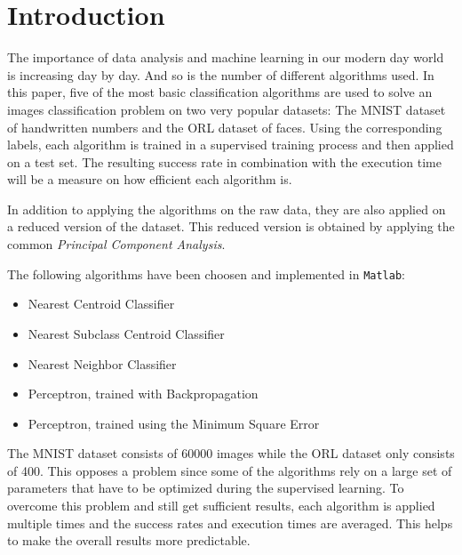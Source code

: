 \section{Introduction}
The importance of data analysis and machine learning in our modern day world is increasing day by day.
And so is the number of different algorithms used.
In this paper, five of the most basic classification algorithms are used to solve an images classification problem on two very popular datasets: The MNIST dataset of handwritten numbers and the ORL dataset of faces.
Using the corresponding labels, each algorithm is trained in a supervised training process and then applied on a test set.
The resulting success rate in combination with the execution time will be a measure on how efficient each algorithm is.

In addition to applying the algorithms on the raw data, they are also applied on a reduced version of the dataset.
This reduced version is obtained by applying the common \textit{Principal Component Analysis}.

The following algorithms have been choosen and implemented in \texttt{Matlab}:
\begin{itemize}
	\item Nearest Centroid Classifier
	\item Nearest Subclass Centroid Classifier
	\item Nearest Neighbor Classifier
	\item Perceptron, trained with Backpropagation
	\item Perceptron, trained using the Minimum Square Error
\end{itemize}

The MNIST dataset consists of 60000 images while the ORL dataset only consists of 400.
This opposes a problem since some of the algorithms rely on a large set of parameters that have to be optimized during the supervised learning.
To overcome this problem and still get sufficient results, each algorithm is applied multiple times and the success rates and execution times are averaged.
This helps to make the overall results more predictable.

